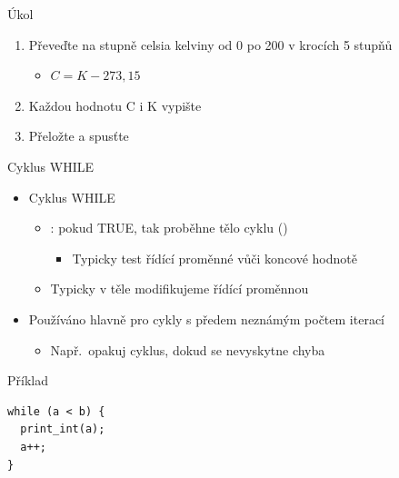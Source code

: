\begin{frame}{Úkol}

  \begin{enumerate}
    \item Převeďte na stupně celsia kelviny od 0 po 200 v krocích 5 stupňů
    \begin{itemize}
      \item $C = K - 273,15$
    \end{itemize}

    \item Každou hodnotu C i K vypište
    \item Přeložte a spusťte
  \end{enumerate}

\end{frame}

\begin{frame}[fragile]{Cyklus WHILE}

  \begin{itemize}
    \item Cyklus WHILE
    \begin{itemize}
      \item {}: pokud TRUE, tak proběhne tělo cyklu
        ()
      \begin{itemize}
	\item Typicky test řídící proměnné vůči koncové hodnotě
      \end{itemize}

      \pause

      \item Typicky v těle modifikujeme řídící proměnnou
    \end{itemize}

    \pause

    \item Používáno hlavně pro cykly s předem neznámým počtem iterací
    \begin{itemize}
      \item Např.\ opakuj cyklus, dokud se nevyskytne chyba
    \end{itemize}

  \end{itemize}

  \pause

  \begin{block}{Příklad}
  \begin{lstlisting}
while (a < b) {
  print_int(a);
  a++;
}
  \end{lstlisting}
  \end{block}

\end{frame}


